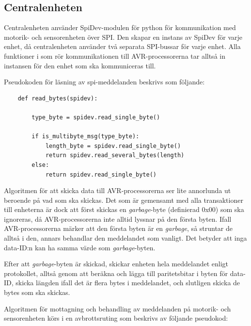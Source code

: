\documentclass[a4paper,titlepage,12pt]{article}
\begin{document}
    \subsection{Centralenheten}

    Centralenheten använder SpiDev-modulen för python för kommunikation med
    motorik- och sensorenheten över SPI. Den skapar en instans av SpiDev för
    varje enhet, då centralenheten använder två separata SPI-bussar för varje
    enhet. Alla funktioner i som rör kommunikationen till AVR-processorerna tar
    alltså in instansen för den enhet som ska kommuniceras till.

    Pseudokoden för läsning av spi-meddelanden beskrivs som följande:

	\begin{lstlisting}
	def read_bytes(spidev):

		type_byte = spidev.read_single_byte()

        if is_multibyte_msg(type_byte):
            length_byte = spidev.read_single_byte()
            return spidev.read_several_bytes(length)
        else:
            return spidev.read_single_byte()

	\end{lstlisting}

	Algoritmen för att skicka data till AVR-processorerna ser lite annorlunda
    ut beroende på vad som ska skickas. Det som är gemensamt med alla
    transaktioner till enheterna är dock att först skickas en \textit{garbage}-byte
    (definierad 0x00) som ska ignoreras,
    då AVR-processorerna inte alltid lyssnar på den första 
    byten. Ifall AVR-processorerna märker att den första byten är en
    \textit{garbage}, så struntar de alltså i den, annars behandlar den
    meddelandet som vanligt. Det betyder att inga data-ID:n kan ha samma
    värde som \textit{garbage}-byten.

    Efter att \textit{garbage}-byten är skickad, skickar enheten hela
    meddelandet enligt protokollet, alltså genom att beräkna och lägga till
    paritetsbitar i byten för data-ID, skicka längden ifall det är flera bytes
    i meddelandet, och slutligen skicka de bytes som ska skickas.

	Algoritmen för mottagning och behandling av meddelanden på motorik- och
    sensorenheten körs i en avbrottsruting som beskrivs av följande pseudokod:
\end{document}

